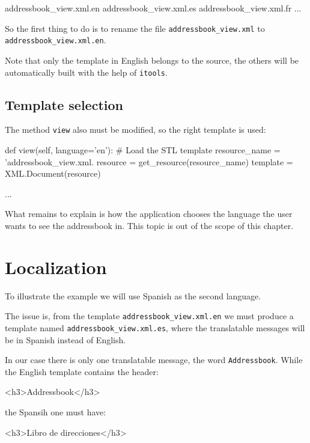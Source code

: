 \begin{code}
    addressbook_view.xml.en
    addressbook_view.xml.es
    addressbook_view.xml.fr
    ...
\end{code}

So the first thing to do is to rename the file {\tt addressbook\_view.xml}
to {\tt addressbook\_view.xml.en}.

Note that only the template in English belongs to the source, the others
will be automatically built with the help of {\tt itools}.

\subsection{Template selection}

The method {\tt view} also must be modified, so the right template is used:

\begin{code}
    def view(self, language='en'):
        # Load the STL template
        resource_name = 'addressbook_view.xml.%
        resource = get_resource(resource_name)
        template = XML.Document(resource)

        ...
\end{code}


What remains to explain is how the application chooses the language the
user wants to see the addressbook in. This topic is out of the scope
of this chapter.

\section{Localization}

To illustrate the example we will use Spanish as the second language.

The issue is, from the template {\tt addressbook\_view.xml.en} we
must produce a template named {\tt addressbook\_view.xml.es}, where
the translatable messages will be in Spanish instead of English.

In our case there is only one translatable message, the word
{\tt Addressbook}. While the English template contains the header:

\begin{code}
    <h3>Addressbook</h3>
\end{code}

the Spansih one must have:

\begin{code}
    <h3>Libro de direcciones</h3>
\end{code}

